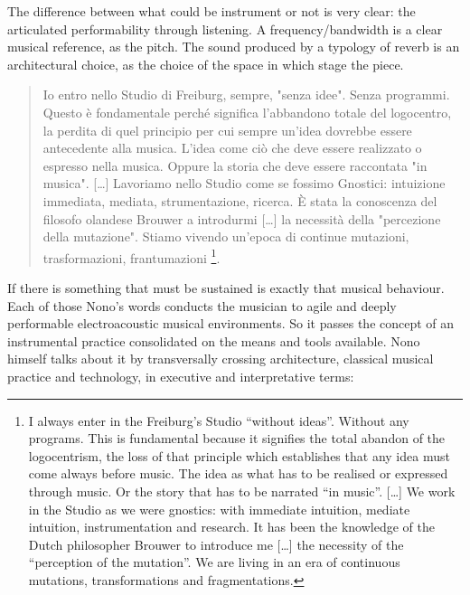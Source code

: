 \documentclass[twoside,a4paper]{article}
\begin{document}
The difference between what could be instrument or not is very clear: the
articulated performability through listening. A frequency/bandwidth is a clear
musical reference, as the pitch. The sound produced by a typology of reverb is
an architectural choice, as the choice of the space in which stage the piece.

\begin{quote}
Io entro nello Studio di Freiburg, sempre, "senza idee". Senza programmi. Questo
è fondamentale perché significa l'abbandono totale del logocentro, la perdita di
quel principio per cui sempre un'idea dovrebbe essere antecedente alla musica.
L'idea come ciò che deve essere realizzato o espresso nella musica. Oppure la
storia che deve essere raccontata "in musica". [\ldots] %
Lavoriamo nello Studio come se fossimo Gnostici: intuizione immediata, mediata,
strumentazione, ricerca. È stata la conoscenza del filosofo olandese Brouwer a
introdurmi [\ldots] la necessità della "percezione della mutazione". Stiamo
vivendo un'epoca di continue mutazioni, trasformazioni, frantumazioni
\cite{nono85}\footnote{I always enter in the Freiburg's Studio “without ideas”.
Without any programs. This is fundamental because it signifies the total abandon
of the logocentrism, the loss of that principle which establishes that any idea
must come always before music. The idea as what has to be realised or expressed
through music. Or the story that has to be narrated “in music”. [\dots] We work
in the Studio as we were gnostics: with immediate intuition, mediate intuition,
instrumentation and research. It has been the knowledge of the Dutch philosopher
Brouwer to introduce me [\dots] the necessity of the “perception of the mutation”.
We are living in an era of continuous mutations, transformations and fragmentations.}.
\end{quote}

If there is something that must be sustained is exactly that musical behaviour.
Each of those Nono's words conducts the musician to agile and deeply performable
electroacoustic musical environments. So it passes the concept of an instrumental
practice consolidated on the means and tools available. Nono himself talks about
it by transversally crossing architecture, classical musical practice and
technology, in executive and interpretative terms:
\end{document}
